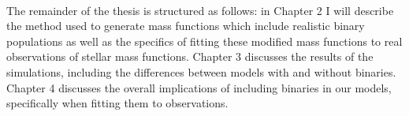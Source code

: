 \paragraph{}
The remainder of the thesis is structured as follows: in Chapter 2 I will describe the method used
to generate mass functions which include realistic binary populations as well as the specifics of
fitting these modified mass functions to real observations of stellar mass functions. Chapter 3
discusses the results of the simulations, including the differences between models with and without
binaries. Chapter 4 discusses the overall implications of including binaries in our models,
specifically when fitting them to observations.



